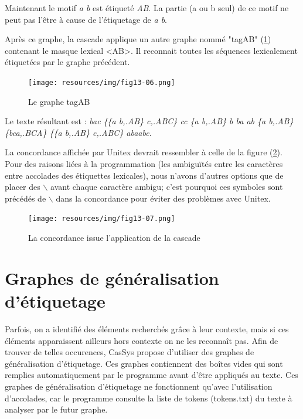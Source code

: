 \bigskip
\noindent Maintenant le motif \emph{a b} est étiqueté \emph{AB}. La partie (a ou b seul) de ce
motif ne peut pas l'être à cause de l'étiquetage de \emph{a b}.

\bigskip
\noindent Après ce graphe, la cascade applique un autre graphe nommé "tagAB" (\ref{fig13-06})
contenant le masque lexical <AB>. Il reconnait toutes les séquences lexicalement étiquetées par le
graphe précédent.

\begin{figure}[!htb]
  \centering
  \texttt{[image: resources/img/fig13-06.png]}
  \caption{Le graphe tagAB}
  \label{fig13-06}
\end{figure}

\bigskip
\noindent Le texte résultant est : \emph{bac \{\{a b,.AB\} c,.ABC\} cc \{a b,.AB\} b ba ab \{a
b,.AB\} \{bca,.BCA\} \{\{a b,.AB\} c,.ABC\} abaabc}.


\bigskip
\noindent La concordance affichée par Unitex devrait ressembler à celle de la figure
(\ref{fig13-07}). Pour des raisons liées à la programmation (les ambiguïtés entre les
	caractères entre accolades des étiquettes lexicales), nous n'avons d'autres options que de
placer des  $\backslash$ avant chaque caractère ambigu; c'est pourquoi ces symboles sont précédés de
$\backslash$ dans la concordance pour éviter des problèmes avec Unitex.

\begin{figure}[!htb]
  \centering
  \texttt{[image: resources/img/fig13-07.png]}
  \caption{La concordance issue l'application de la cascade}
  \label{fig13-07}
\end{figure}

\section{Graphes de g\'{e}n\'{e}ralisation d'\'{e}tiquetage}
\label{section:graphe_generalisation}

Parfois, on a identifi\'{e} des \'{e}l\'{e}ments recherch\'{e}s gr\^{a}ce \`{a} leur contexte, mais si ces \'{e}l\'{e}ments apparaissent ailleurs hors contexte on ne les reconna\^{i}t pas. Afin de trouver de telles occurences, CasSys propose d'utiliser des graphes de g\'{e}n\'{e}ralisation d'\'{e}tiquetage. Ces graphes contiennent des bo\^{i}tes vides qui sont remplies automatiquement par le programme avant d'\^{e}tre appliqu\'{e}s au texte. Ces graphes de g\'{e}n\'{e}ralisation d'\'{e}tiquetage ne fonctionnent qu'avec l'utilisation d'accolades, car le programme consulte la liste de tokens (tokens.txt) du texte \`{a} analyser par le futur graphe.


